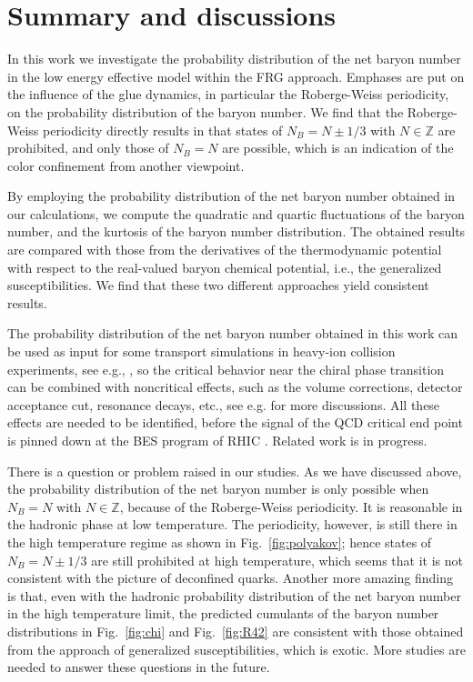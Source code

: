 \documentclass[%
reprint,
superscriptaddress,
showpacs,preprintnumbers,
 amsmath,amssymb,
 aps,
prd,
]{revtex4-1}
\def\Fig#1{Fig.~\ref{#1}} \def\Tab#1{Tab.~\ref{#1}}
\begin{document}

\section{Summary and discussions}
\label{sec:sum}

In this work we investigate the probability distribution of the net baryon number in the low energy effective model within the FRG approach. Emphases are put on the influence of the glue dynamics, in particular the Roberge-Weiss periodicity, on the probability distribution of the baryon number. We find that the Roberge-Weiss periodicity directly results in that states of $N_B=N\pm 1/3$ with $N\in\mathbb{Z}$ are prohibited, and only those of $N_B=N$ are possible, which is an indication of the color confinement from another viewpoint.

By employing the probability distribution of the net baryon number obtained in our calculations, we compute the quadratic and quartic fluctuations of the baryon number, and the kurtosis of the baryon number distribution. The obtained results are compared with those from the derivatives of the thermodynamic potential with respect to the real-valued baryon chemical potential, i.e., the generalized susceptibilities. We find that these two different approaches yield consistent results.

The probability distribution of the net baryon number obtained in this work can be used as input for some transport simulations in heavy-ion collision experiments, see e.g., \cite{Xu:2016skm}, so the critical behavior near the chiral phase transition can be combined with noncritical effects, such as the  volume corrections, detector acceptance cut, resonance decays, etc., see e.g. \cite{Braun-Munzinger:2016yjz} for more discussions. All these effects are needed to be identified, before the signal of the QCD critical end point is pinned down at the BES program of RHIC \cite{Luo:2017faz}. Related work is in progress.

There is a question or problem raised in our studies. As we have discussed above, the probability distribution of the net baryon number is only possible when $N_B=N$ with $N\in\mathbb{Z}$, because of the Roberge-Weiss periodicity. It is reasonable in the hadronic phase at low temperature. The periodicity, however, is still there in the high temperature regime as shown in \Fig{fig:polyakov}; hence states of  $N_B=N\pm 1/3$ are still prohibited at high temperature, which seems that it is not consistent with the picture of deconfined quarks. Another more amazing finding is that, even with the hadronic probability distribution of the net baryon number in the high temperature limit, the predicted cumulants of the baryon number distributions in \Fig{fig:chi} and \Fig{fig:R42} are consistent with those obtained from the approach of generalized susceptibilities, which is exotic. More studies are needed to answer these questions in the future.
\end{document}

